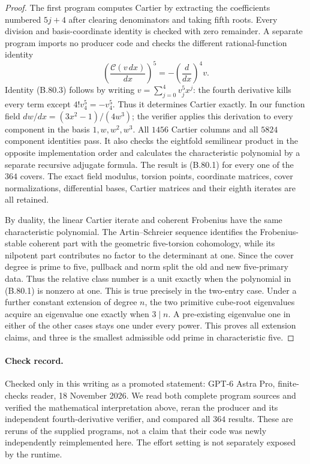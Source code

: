 \begin{proof}
The first program computes Cartier by extracting the coefficients
numbered $5j+4$ after clearing denominators and taking fifth roots.
Every division and basis-coordinate identity is checked with zero
remainder. A separate program imports no producer code and checks
the different rational-function identity
\[
 \left(\frac{\mathcal C(v\,dx)}{dx}\right)^5
                          =-\left(\frac d{dx}\right)^4v.
                                                               \tag{B.80.3}
\]
Identity (B.80.3) follows by writing
$v=\sum_{j=0}^4v_j^5x^j$: the fourth derivative kills every term
except $4!v_4^5=-v_4^5$. Thus it determines Cartier exactly.
In our function field $dw/dx=(3x^2-1)/(4w^3)$; the verifier applies
this derivation to every component in the basis $1,w,w^2,w^3$.
All $1456$ Cartier columns and all $5824$ component identities pass.
It also checks the eightfold semilinear product in the opposite
implementation order and calculates the characteristic polynomial
by a separate recursive adjugate formula. The result is (B.80.1) for
every one of the $364$ covers. The exact field modulus, torsion
points, coordinate matrices, cover normalizations, differential
bases, Cartier matrices and their eighth iterates are all retained.

By duality, the linear Cartier iterate and coherent Frobenius have
the same characteristic polynomial. The Artin--Schreier sequence
identifies the Frobenius-stable coherent part with the geometric
five-torsion cohomology, while its nilpotent part contributes no
factor to the determinant at one. Since the cover degree is prime
to five, pullback and norm split the old and new five-primary data.
Thus the relative class number is a unit exactly when the polynomial
in (B.80.1) is nonzero at one. This is true precisely in the two-entry
case. Under a further constant extension of degree $n$, the two
primitive cube-root eigenvalues acquire an eigenvalue one exactly
when $3\mid n$. A pre-existing eigenvalue one in either of the
other cases stays one under every power. This proves all extension
claims, and three is the smallest admissible odd prime in
characteristic five.
\end{proof}

\paragraph{Check record.}
Checked only in this writing as a promoted statement: GPT-6 Astra Pro,
finite-checks reader, 18 November 2026. We read both complete program
sources and verified the mathematical interpretation above, reran the
producer and its independent fourth-derivative verifier, and compared
all $364$ results. These are reruns of the supplied programs, not a
claim that their code was newly independently reimplemented here.
The effort setting is not separately exposed by the runtime.

